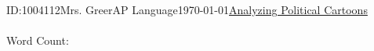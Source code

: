 \documentclass[12pt,letterpaper]{article}
\begin{document}
\begin{mla}{ID:}{1004112}{Mrs. Greer}{AP Language}{\today}{\underline{Analyzing Political Cartoons}} 

  \begin{justifying}

    \paragraph{} 
      
\end{justifying}
\centering Word Count: 

\end{mla}
\end{document}
